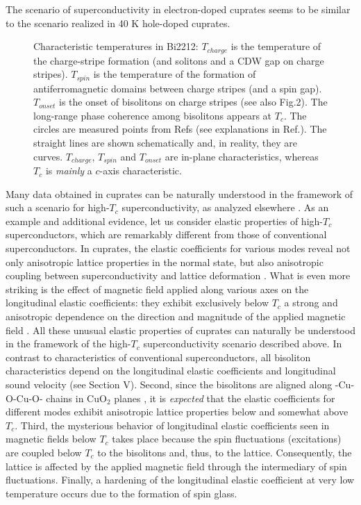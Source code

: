 The scenario of superconductivity in electron-doped cuprates seems to be 
similar to the scenario realized in 40 K hole-doped cuprates.
\begin{figure}[t]
\leftskip-10pt
\columnwidth
\centerline{}
\vspace{2mm}
\caption{Characteristic temperatures in Bi2212: $T_{charge}$ is the 
temperature of the charge-stripe formation (and solitons and a CDW gap 
on charge stripes). $T_{spin}$ is the temperature of the formation of 
antiferromagnetic domains between charge stripes (and a spin gap). 
$T_{onset}$ is the onset of bisolitons on charge stripes (see also Fig.2). 
The long-range phase coherence among bisolitons appears at $T_{c}$. The 
circles are measured points from Refs\protect\cite{Ekino,AMour4} (see 
explanations in Ref.\protect\cite{AMour4}). The straight lines are shown 
schematically and, in reality, they are curves. $T_{charge}$, $T_{spin}$ 
and $T_{onset}$ are in-plane characteristics, whereas $T_{c}$ is 
{\em mainly} a $c$-axis characteristic.}
\label{fig3}
\end{figure}

Many data obtained in cuprates can be naturally understood in the 
framework of such a scenario for high-$T_{c}$ superconductivity, as
analyzed elsewhere \cite{AMour3}. As an example and 
additional evidence, let us consider elastic properties of high-$T_{c}$ 
superconductors, which are remarkably different from those of 
conventional superconductors. 
In cuprates, the elastic coefficients for various modes reveal not 
only anisotropic lattice properties in the normal state, but also anisotropic 
coupling between superconductivity and lattice deformation 
\cite{sound,sound1}. What is even more striking is the effect of magnetic 
field applied along various axes on the longitudinal elastic coefficients: 
they exhibit exclusively below $T_{c}$ a strong and anisotropic dependence 
on the direction and magnitude of the applied magnetic field \cite{sound}. 
All these unusual elastic properties of cuprates can naturally be understood 
in the framework of the high-$T_{c}$ superconductivity scenario described 
above. In contrast to characteristics of conventional superconductors, all 
bisoliton characteristics depend on the longitudinal elastic coefficients 
and longitudinal sound velocity (see Section V). Second, since the bisolitons 
are aligned along -Cu-O-Cu-O- 
chains in CuO$_{2}$ planes \cite{Davydov1,Davydov2}, it is {\em expected} 
that the elastic coefficients for different modes exhibit anisotropic lattice 
properties below and somewhat above $T_{c}$. Third, the mysterious 
behavior of longitudinal elastic coefficients seen in magnetic fields 
below $T_{c}$ \cite{sound} takes place because the spin fluctuations 
(excitations) are coupled below $T_{c}$ to the bisolitons and, thus, to the 
lattice. Consequently, the lattice is affected by the applied magnetic field 
through the intermediary of spin fluctuations. Finally, a hardening of the
longitudinal elastic coefficient at very low temperature occurs due to 
the formation of spin glass.

